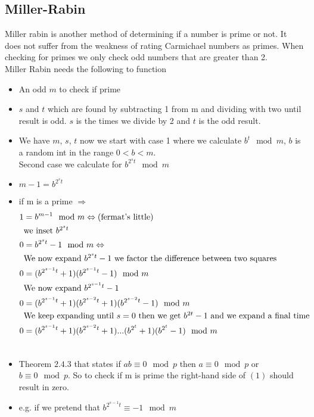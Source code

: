 \subsection{Miller-Rabin}
Miller rabin is another method of determining if a number is prime or not. It does not suffer from the weakness of rating Carmichael numbers as primes. When checking for primes we only check odd numbers that are greater than 2.\\
Miller Rabin needs the following to function
\begin{itemize}
\item An odd $m$ to check if prime
\item $s$ and $t$ which are found by subtracting 1 from m and dividing with two until result is odd. $s$ is the times we divide by 2 and $t$ is the odd result.
\item We have $m$, $s$, $t$ now we start with case 1 where we calculate $b^t\mod m$, $b$ is a random int in the range $0<b<m$.\\
Second case we calculate for $b^{2^st}\mod m$
\item $m-1=b^{2^st}$ 
\item if m is a prime $\Rightarrow$
\begin{align}
1&=b^{m-1}\mod m \Leftrightarrow\mbox{(fermat's little)}\notag\\
&\mbox{we inset $b^{2^st}$}\notag\\
0&=b^{2^st}-1\mod m \Leftrightarrow\notag\\
&\mbox{We now expand $b^{2^st}-1$ we factor the difference between two squares}\notag \\
0&=(b^{2^{s-1}t}+1)(b^{2^{s-1}t}-1)\mod m\notag\\
&\mbox{We now expand $b^{2^{s-1}t}-1$}\notag\\
0&=(b^{2^{s-1}t}+1)(b^{2^{s-2}t}+1)(b^{2^{s-2}t}-1)\mod m\notag\\
&\mbox{We keep expanding until $s=0$ then we get $b^{2t}-1$ and we expand a final time}\notag\\
0&=(b^{2^{s-1}t}+1)(b^{2^{s-2}t}+1)...(b^{2^t}+1)(b^{2^t}-1)\mod m\\
\notag
\end{align}
\item Theorem $2.4.3$ that states if $ab\equiv 0 \mod p$ then $a\equiv 0 \mod p$ or $b\equiv 0 \mod p$. So to check if m is prime the right-hand side of $(1)$ should result in zero.
\item e.g. if we pretend that $b^{2^{s-1}t}\equiv -1 \mod m$
\begin{align*}

\end{align*}
\end{itemize}
